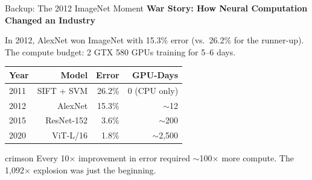 \documentclass[aspectratio=169, 12pt]{beamer}
\begin{document}
\begin{frame}{Backup: The 2012 ImageNet Moment}
\note{[2 min]


}
\footnotesize
\textbf{War Story: How Neural Computation Changed an Industry}

\vspace{0.1cm}
In 2012, AlexNet won ImageNet with 15.3\% error (vs.\ 26.2\% for the runner-up). The compute budget: 2 GTX 580 GPUs training for 5--6 days.

\vspace{0.05cm}
\scriptsize
\renewcommand{\arraystretch}{1.05}
\begin{tabular}{@{}lrrr@{}}
  \toprule
  \textbf{Year} & \textbf{Model} & \textbf{Error} & \textbf{GPU-Days} \\
  \midrule
  2011 & SIFT + SVM & 26.2\% & 0 (CPU only) \\
  2012 & AlexNet & 15.3\% & $\sim$12 \\
  2015 & ResNet-152 & 3.6\% & $\sim$200 \\
  2020 & ViT-L/16 & 1.8\% & $\sim$2,500 \\
  \bottomrule
\end{tabular}

\vspace{0.05cm}
\footnotesize
\begin{mlsyscard}{crimson}
{\scriptsize Every 10$\times$ improvement in error required $\sim$100$\times$ more compute. The 1,092$\times$ explosion was just the beginning.}
\end{mlsyscard}
\end{frame}
\end{document}
